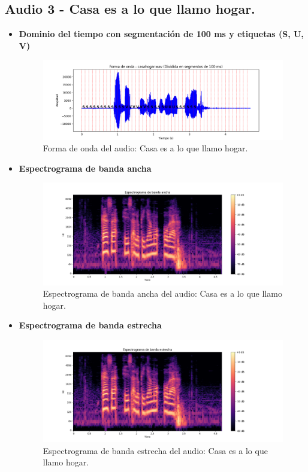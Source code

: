\documentclass{report}
\begin{document}
\subsection{Audio 3 - Casa es a lo que llamo hogar.}
\begin{itemize}
    \item \textbf{Dominio del tiempo con segmentación de 100 ms y etiquetas (S, U, V)}
    \begin{figure}[h]
        \centering
        \includegraphics[width=\linewidth]{a3.png}
        \caption{Forma de onda del audio: Casa es a lo que llamo hogar.}
        \label{fig:forma_onda_audio3div}
    \end{figure}
    \item \textbf{Espectrograma de banda ancha}
    \begin{figure}[h]
        \centering
        \includegraphics[width=\linewidth]{ancha3.png}
        \caption{Espectrograma de banda ancha del audio: Casa es a lo que llamo hogar.}
        \label{fig:espectograma banda ancha audio3}
    \end{figure}
    \newpage
    \item \textbf{Espectrograma de banda estrecha}
    \begin{figure}[h]
        \centering
        \includegraphics[width=\linewidth]{estrecha3.png}
        \caption{Espectrograma de banda estrecha del audio: Casa es a lo que llamo hogar.}
        \label{fig:espectograma banda estrecha audio3}
    \end{figure}
\end{itemize}
\end{document}
